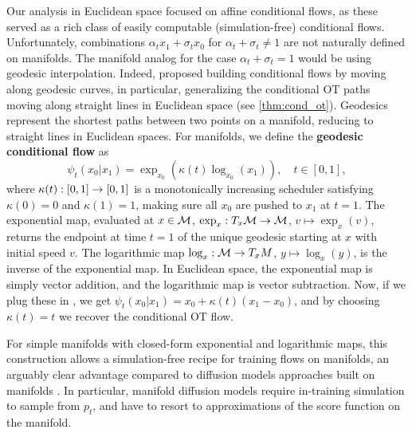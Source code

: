 \documentclass{fairmeta}
\newcommand{\highlight}[1]{{\color{metablue} \textbf{#1}}}
\renewcommand{\eqref}[1]{\labelcref{#1}}
\numberwithin{equation}{section}
\begin{document}
Our analysis in Euclidean space focused on affine conditional flows, as these served as a rich class of easily computable (simulation-free) conditional flows.
Unfortunately,  combinations $\alpha_t x_1 + \sigma_t x_0$ for $\alpha_t+\sigma_t\ne1$ are not naturally defined on manifolds. The manifold analog for the case $\alpha_t+\sigma_t=1$ would be using  geodesic interpolation. 
Indeed, \citet{chen2024flow} proposed building conditional flows by moving along geodesic curves, in particular, generalizing the conditional OT paths moving along straight lines in Euclidean space (see \cref{thm:cond_ot}). Geodesics represent the shortest paths between two points on a manifold, reducing to straight lines in Euclidean spaces.
For manifolds, we define the \highlight{geodesic conditional flow} as
\begin{equation}\label{e:exp_log}
    \psi_t (x_0|x_1)= \exp_{x_0} (\kappa(t) \log_{x_0}(x_1)), \quad t\in[0,1],%
\end{equation}
where $\kappa(t):[0,1]\rightarrow[0,1]$ is a monotonically increasing scheduler satisfying $\kappa(0)=0$ and $\kappa(1)=1$, making sure all $x_0$ are pushed to $x_1$ at $t=1$. The exponential map, evaluated at $x\in{\mathcal{M}}$, $\exp_x:T_x{\mathcal{M}}\rightarrow {\mathcal{M}}$, $v\mapsto \exp_x(v)$, returns the endpoint at time $t=1$ of the unique geodesic starting at $x$ with initial speed $v$. The logarithmic map $\log_{x}:{\mathcal{M}}\rightarrow  T_xM$, $y\mapsto \log_x(y)$, is the inverse of the exponential map. In Euclidean space, the exponential map is simply vector addition, and the logarithmic map is vector subtraction.
Now, if we plug these in \eqref{e:exp_log}, we get $\psi_t (x_0|x_1)= x_0 + \kappa(t)(x_1-x_0)$, and by choosing $\kappa(t)=t$ we recover the conditional OT flow.

For simple manifolds with closed-form exponential and logarithmic maps, this construction allows a simulation-free recipe for training flows on manifolds, an arguably clear advantage compared to diffusion models approaches built on manifolds \citep{de2022riemannian,huang2022rimannian,lou2023scaling}.
In particular, manifold diffusion models require in-training simulation to sample from $p_t$, and have to resort to approximations of the score function on the manifold.  
\end{document}
